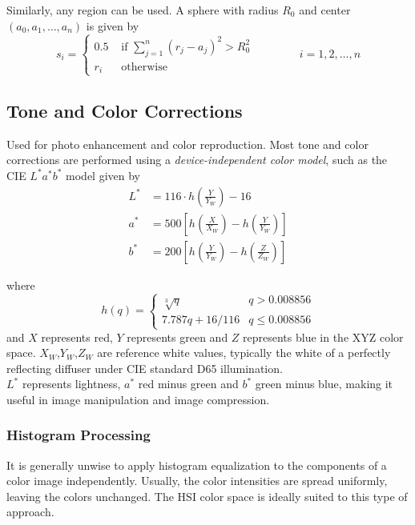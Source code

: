 Similarly, any region can be used. A sphere with radius $R_0$ and center $(a_0,a_1,\dots,a_n)$ is given by
\begin{equation}
	s_i = \begin{cases}
		0.5 & \text{  if } \sum_{j=1}^{n} (r_j - a_j)^2 > R_0^2 \\
		r_i & \text{  otherwise}
	\end{cases} \qquad \qquad i = 1,2,\dots,n
\end{equation}

\subsection{Tone and Color Corrections } 
Used for photo enhancement and color reproduction. Most tone and color corrections are performed using a \textit{device-independent color model}, such as the CIE $L^* a^* b^*$ model given by
\begin{align}
	L^* &= 116 \cdot h(\frac{Y}{Y_W}) - 16 \\
	a^* &= 500 \left[ h(\frac{X}{X_W}) - h(\frac{Y}{Y_W}) \right] \\
	b^* &= 200 \left[ h(\frac{Y}{Y_W}) - h(\frac{Z}{Z_W}) \right]
\end{align}

where
\begin{equation}
	h(q) = \begin{cases}
		\sqrt[3]{q} & q > 0.008856 \\
		7.787q + 16/116 & q \leq 0.008856
	\end{cases}
\end{equation}
and $X$ represents red, $Y$ represents green and $Z$ represents blue in the XYZ color space. $X_W$,$Y_W$,$Z_W$ are reference white values, typically the white of a perfectly reflecting diffuser under CIE standard D65 illumination. \\

$L^*$ represents lightness, $a^*$ red minus green and $b^*$ green minus blue, making it useful in image manipulation and image compression.

\subsubsection{Histogram Processing }
It is generally unwise to apply histogram equalization to the components of a color image independently. Usually, the color intensities are spread uniformly, leaving the colors unchanged. The HSI color space is ideally suited to this type of approach.


